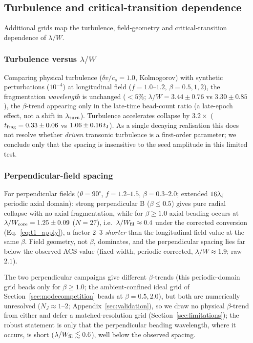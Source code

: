 \documentclass[usenatbib,twoside,twocolumn]{mnras}
\begin{document}
\subsection{Turbulence and critical-transition dependence}
\label{sec:supplementary_campaigns}

Additional grids map the turbulence, field-geometry and critical-transition dependence of $\lambda/W$.

\subsubsection{Turbulence versus $\lambda/W$}

Comparing physical turbulence ($\delta v/c_s=1.0$, Kolmogorov) with synthetic perturbations ($10^{-4}$) at longitudinal field ($f=1.0$--$1.2$, $\beta=0.5,1,2$), the fragmentation \textit{wavelength} is unchanged ($<5\%$; $\lambda/W=3.44\pm0.76$ vs $3.30\pm0.85$), the $\beta$-trend appearing only in the late-time bead-count ratio (a late-epoch effect, not a shift in $\lambda_{\rm turn}$). Turbulence accelerates collapse by $3.2\times$ ($t_{\rm frag}=0.33\pm0.06$ vs $1.06\pm0.16\,t_{\rm J}$). As a single decaying realisation this does not resolve whether \emph{driven} transonic turbulence is a first-order parameter; we conclude only that the spacing is insensitive to the seed amplitude in this limited test.

\subsubsection{Perpendicular-field spacing}

For perpendicular fields ($\theta=90^\circ$, $f=1.2$--$1.5$, $\beta=0.3$--$2.0$; extended $16\lambda_{\rm J}$ periodic axial domain): strong perpendicular B ($\beta\leq0.5$) gives pure radial collapse with no axial fragmentation, while for $\beta\geq1.0$ axial beading occurs at $\lambda/W_{\rm core}=1.25\pm0.09$ ($N=27$), i.e.\ $\lambda/W_{\rm fil}\approx0.4$ under the corrected conversion (Eq.~\ref{eq:t1_apply}), a factor $2$--$3$ \textit{shorter} than the longitudinal-field value at the same $\beta$. Field geometry, not $\beta$, dominates, and the perpendicular spacing lies far below the observed ACS value (fixed-width, periodic-corrected, $\lambda/W\approx1.9$; raw $2.1$).

The two perpendicular campaigns give different $\beta$-trends (this periodic-domain grid beads only for $\beta\geq1.0$; the ambient-confined ideal grid of Section~\ref{sec:modecompetition} beads at $\beta=0.5,2.0$), but both are numerically unresolved ($N_J\approx1$--$2$; Appendix~\ref{sec:validation}), so we draw no physical $\beta$-trend from either and defer a matched-resolution grid (Section~\ref{sec:limitations}); the robust statement is only that the perpendicular beading wavelength, where it occurs, is short ($\lambda/W_{\rm fil}\lesssim0.6$), well below the observed spacing.
\end{document}

